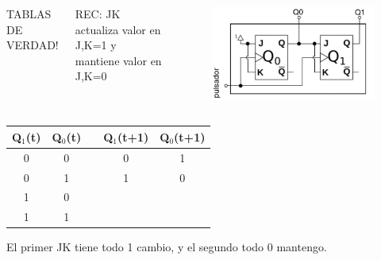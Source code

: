 \documentclass[10pt]{beamer}
\begin{document}
\begin{frame}
{\begin{columns}
\begin{mdframed}[backgroundcolor=frenchblue!20]
  TABLAS DE VERDAD!
\end{mdframed}
\vspace{0.15cm}
REC: JK actualiza valor en J,K=1 y mantiene valor en J,K=0
\begin{figure}[h!]
    \centering
    \includegraphics[scale=0.23]{circuito.png}
\end{figure}
\end{columns}
\begin{table}[h!]
\begin{tabular}{|c|c|c|c|c|}
\hline
Q$_1$(t) & Q$_0$(t) &  & Q$_1$(t+1) & Q$_0$(t+1) \\ \hline
0        & 0        &  & 0          & 1          \\ \hline
0        & 1        &  & 1          & 0          \\ \hline
1        & 0        &  &           &          \\ \hline
1        & 1        &  &           &           \\ \hline
\end{tabular}
\end{table}El primer JK tiene todo 1 cambio, y el segundo todo 0 mantengo.}

\end{frame}
\end{document}
